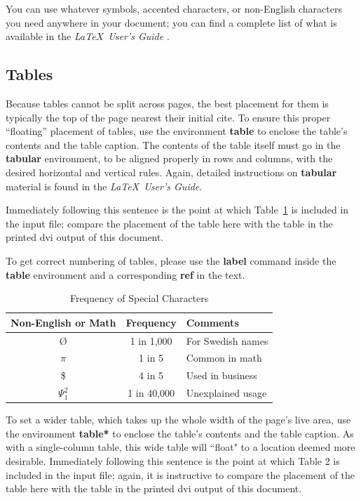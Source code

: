 \documentclass{nime-alternate} %
\begin{document}
You can use whatever symbols, accented characters, or
non-English characters you need anywhere in your document;
you can find a complete list of what is
available in the \textit{\LaTeX\
User's Guide} \cite{Lamport:LaTeX}.


\subsection{Tables}
Because tables cannot be split across pages, the best
placement for them is typically the top of the page
nearest their initial cite.  To
ensure this proper ``floating'' placement of tables, use the
environment \textbf{table} to enclose the table's contents and
the table caption.  The contents of the table itself must go
in the \textbf{tabular} environment, to
be aligned properly in rows and columns, with the desired
horizontal and vertical rules.  Again, detailed instructions
on \textbf{tabular} material
is found in the \textit{\LaTeX\ User's Guide}.

Immediately following this sentence is the point at which
Table~\ref{tab:frequency} is included in the input file; compare the
placement of the table here with the table in the printed
dvi output of this document. 

To get correct numbering of tables, please use the \textbf{label} command inside the \textbf{table} environment and a corresponding \textbf{ref} in the text.

\begin{table}
\centering
\caption{Frequency of Special Characters}
\begin{tabular}{|c|c|l|} \hline
Non-English or Math&Frequency&Comments\\ \hline
\O & 1 in 1,000& For Swedish names\\ \hline
$\pi$ & 1 in 5& Common in math\\ \hline
\$ & 4 in 5 & Used in business\\ \hline
$\Psi^2_1$ & 1 in 40,000& Unexplained usage\\
\hline\end{tabular}
\label{tab:frequency}
\end{table}

To set a wider table, which takes up the whole width of
the page's live area, use the environment
\textbf{table*} to enclose the table's contents and
the table caption.  As with a single-column table, this wide
table will ``float" to a location deemed more desirable.
Immediately following this sentence is the point at which
Table 2 is included in the input file; again, it is
instructive to compare the placement of the
table here with the table in the printed dvi
output of this document.
\end{document}

